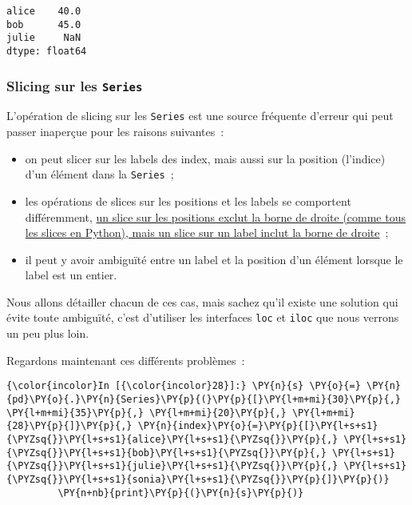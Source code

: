     \begin{Verbatim}[commandchars=\\\{\},frame=single,framerule=0.3mm,rulecolor=\color{cellframecolor}]
alice    40.0
bob      45.0
julie     NaN
dtype: float64
\end{Verbatim}

    \hypertarget{slicing-sur-les-series}{%
\subsubsection{\texorpdfstring{Slicing sur les
\texttt{Series}}{Slicing sur les Series}}\label{slicing-sur-les-series}}

    L'opération de slicing sur les \texttt{Series} est une source fréquente
d'erreur qui peut passer inaperçue pour les raisons suivantes~:

\begin{itemize}
\tightlist
\item
  on peut slicer sur les labels des index, mais aussi sur la position
  (l'indice) d'un élément dans la \texttt{Series}~;
\item
  les opérations de slices sur les positions et les labels se comportent
  différemment,
  \href{http://pandas.pydata.org/pandas-docs/stable/gotchas.html\#endpoints-are-inclusive}{un
  slice sur les positions exclut la borne de droite (comme tous les
  slices en Python), mais un slice sur un label inclut la borne de
  droite}~;
\item
  il peut y avoir ambiguïté entre un label et la position d'un élément
  lorsque le label est un entier.
\end{itemize}

Nous allons détailler chacun de ces cas, mais sachez qu'il existe une
solution qui évite toute ambiguïté, c'est d'utiliser les interfaces
\texttt{loc} et \texttt{iloc} que nous verrons un peu plus loin.

Regardons maintenant ces différents problèmes~:

    \begin{Verbatim}[commandchars=\\\{\},frame=single,framerule=0.3mm,rulecolor=\color{cellframecolor}]
{\color{incolor}In [{\color{incolor}28}]:} \PY{n}{s} \PY{o}{=} \PY{n}{pd}\PY{o}{.}\PY{n}{Series}\PY{p}{(}\PY{p}{[}\PY{l+m+mi}{30}\PY{p}{,} \PY{l+m+mi}{35}\PY{p}{,} \PY{l+m+mi}{20}\PY{p}{,} \PY{l+m+mi}{28}\PY{p}{]}\PY{p}{,} \PY{n}{index}\PY{o}{=}\PY{p}{[}\PY{l+s+s1}{\PYZsq{}}\PY{l+s+s1}{alice}\PY{l+s+s1}{\PYZsq{}}\PY{p}{,} \PY{l+s+s1}{\PYZsq{}}\PY{l+s+s1}{bob}\PY{l+s+s1}{\PYZsq{}}\PY{p}{,} \PY{l+s+s1}{\PYZsq{}}\PY{l+s+s1}{julie}\PY{l+s+s1}{\PYZsq{}}\PY{p}{,} \PY{l+s+s1}{\PYZsq{}}\PY{l+s+s1}{sonia}\PY{l+s+s1}{\PYZsq{}}\PY{p}{]}\PY{p}{)}
         \PY{n+nb}{print}\PY{p}{(}\PY{n}{s}\PY{p}{)}
\end{Verbatim}


